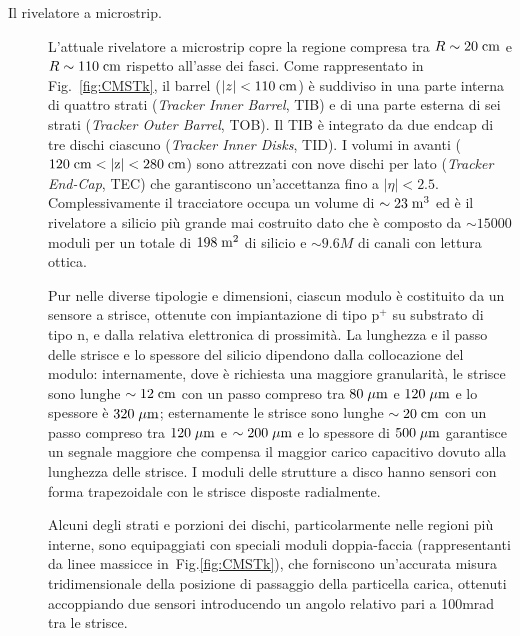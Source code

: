 \begin{description}
\item[Il rivelatore a microstrip.] L'attuale rivelatore a microstrip copre la regione compresa tra $R\sim 20\rm \; cm$ e $R\sim 110\rm \; cm$ rispetto all'asse dei fasci. Come rappresentato in Fig.~\ref{fig:CMSTk}, il barrel ($|z|<110\rm \; cm$) \`e suddiviso in una parte interna di quattro strati ({\em Tracker Inner Barrel}, TIB) e di una parte esterna di sei strati ({\em Tracker Outer Barrel}, TOB). Il TIB \`e integrato da due endcap di tre dischi ciascuno ({\em Tracker Inner Disks}, TID). I volumi in avanti ($120\rm \; cm < |z| < 280\rm \; cm$) sono attrezzati con nove dischi per lato ({\em Tracker End-Cap}, TEC) che garantiscono un'accettanza fino a $|\eta|<2.5$. Complessivamente il tracciatore occupa un volume di $\sim 23\rm \; m^3$ ed \`e il rivelatore a silicio pi\`u grande mai costruito dato che \`e composto da $\sim 15000$ moduli per un totale di $198\rm \; m^2$ di silicio e $\sim 9.6M$ di canali con lettura ottica.

Pur nelle diverse tipologie e dimensioni, ciascun modulo \`e costituito da un sensore a strisce, ottenute con impiantazione di tipo p$^+$ su substrato di tipo n, e dalla relativa elettronica di prossimit\`a. La lunghezza e il passo delle strisce e lo spessore del silicio dipendono dalla collocazione del modulo: internamente, dove \`e richiesta una maggiore granularit\`a, le strisce sono lunghe $\sim 12\rm \; cm$ con un passo compreso tra $80\; \mu \rm m$ e $120\; \mu \rm m$ e lo spessore \`e $320\; \mu \rm m$; esternamente le strisce sono lunghe $\sim 20\rm \; cm$ con un passo compreso tra $120\; \mu \rm m$ e $\sim 200\; \mu \rm m$ e lo spessore di $500\; \mu \rm m$ garantisce un segnale maggiore che compensa il maggior carico capacitivo dovuto alla lunghezza delle strisce. I moduli delle strutture a disco hanno sensori con forma trapezoidale con le strisce disposte radialmente.

Alcuni degli strati e porzioni dei dischi, particolarmente nelle regioni pi\`u interne, sono equipaggiati con speciali moduli doppia-faccia (rappresentanti da linee massicce in~Fig.\ref{fig:CMSTk}), che forniscono un'accurata misura tridimensionale della posizione di passaggio della particella carica, ottenuti accoppiando due sensori introducendo un angolo relativo pari a 100mrad tra le strisce. 
\end{description}

